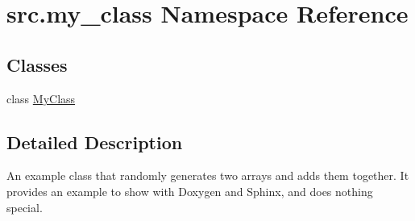 \hypertarget{namespacesrc_1_1my__class}{}\section{src.\+my\+\_\+class Namespace Reference}
\label{namespacesrc_1_1my__class}
\subsection*{Classes}
\begin{DoxyCompactItemize}
\item 
class \hyperlink{classsrc_1_1my__class_1_1MyClass}{My\+Class}
\end{DoxyCompactItemize}


\subsection{Detailed Description}
\begin{DoxyVerb}An example class that randomly generates two arrays
and adds them together.  It provides an example to show
with Doxygen and Sphinx, and does nothing special.
\end{DoxyVerb}
 